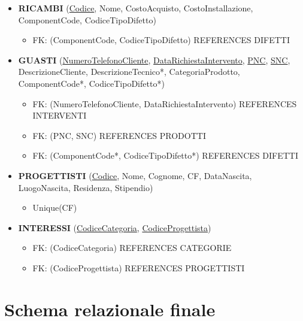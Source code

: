 \documentclass[a4paper, 12pt]{report}
\begin{document}
\begin{itemize}
	\item \textbf{RICAMBI} (\underline{Codice}, Nome, CostoAcquisto, CostoInstallazione, ComponentCode, CodiceTipoDifetto)
		\begin{itemize}[leftmargin=*, topsep=0pt]
			\item[] FK: (ComponentCode, CodiceTipoDifetto) REFERENCES DIFETTI
		\end{itemize}		
	\item \textbf{GUASTI} (\underline{NumeroTelefonoCliente}, \underline{DataRichiestaIntervento}, \underline{PNC}, \underline{SNC}, DescrizioneCliente, DescrizioneTecnico*, CategoriaProdotto, ComponentCode*,
	CodiceTipoDifetto*)
		\begin{itemize}[leftmargin=*, topsep=0pt]
			\item[] FK: (NumeroTelefonoCliente, DataRichiestaIntervento) REFERENCES INTERVENTI
			\item[] FK: (PNC, SNC) REFERENCES PRODOTTI
			\item[] FK: (ComponentCode*, CodiceTipoDifetto*) REFERENCES DIFETTI
		\end{itemize}
	\item \textbf{PROGETTISTI} (\underline{Codice}, Nome, Cognome, CF, DataNascita, LuogoNascita, Residenza, Stipendio)
		\begin{itemize}[leftmargin=*, topsep=0pt]
			\item[] Unique(CF)
		\end{itemize}
	\item \textbf{INTERESSI} (\underline{CodiceCategoria}, \underline{CodiceProgettista})
		\begin{itemize}[leftmargin=*, topsep=0pt]
			\item[] FK: (CodiceCategoria) REFERENCES CATEGORIE
			\item[] FK: (CodiceProgettista) REFERENCES PROGETTISTI
		\end{itemize}
\end{itemize}

\section{Schema relazionale finale}
\end{document}
